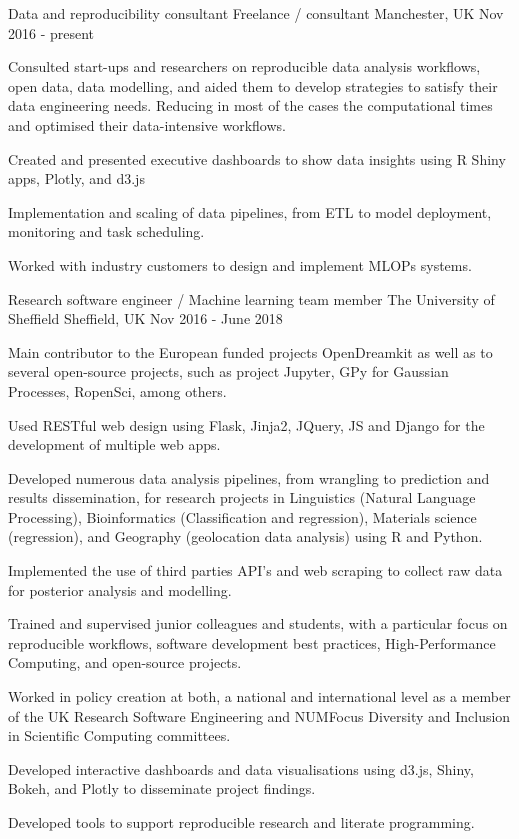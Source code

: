 \begin{cventries}
\cventry
{Data and reproducibility consultant } %
{Freelance / consultant } %
{Manchester,  UK} %
{Nov 2016 - present } %
{ %
\begin{cvitems}
\item {Consulted start-ups and researchers on reproducible data analysis workflows, open data, data modelling, and aided them to develop strategies to satisfy their data engineering needs. Reducing in most of the cases the computational times and optimised their data-intensive workflows.}
 \item {Created and presented executive dashboards to show data insights using R Shiny apps, Plotly, and d3.js}
 \item {Implementation and scaling of data pipelines, from ETL to model deployment, monitoring and task scheduling.}
 \item{Worked with industry customers to design and implement MLOPs systems.}
\end{cvitems}
}



\cventry
{Research software engineer  / Machine learning team member } %
{The University of Sheffield } %
{Sheffield, UK} %
{Nov 2016 - June 2018 } %
{ %
\begin{cvitems}
\item {Main contributor to  the European funded projects OpenDreamkit as well as to several open-source projects, such as project Jupyter, GPy for Gaussian Processes, RopenSci, among others.}
\item {Used RESTful web design using Flask, Jinja2, JQuery, JS and Django for the development of multiple web apps.}
\item {Developed numerous data analysis pipelines, from wrangling to prediction and results dissemination, for research projects in Linguistics (Natural Language Processing), Bioinformatics (Classification and regression), Materials science (regression), and Geography (geolocation data analysis) using R and Python.}
\item { Implemented the use of third parties API's and web scraping to collect raw data for posterior analysis and modelling.}
\item {Trained and supervised junior colleagues and students, with a particular focus on reproducible workflows, software development best practices, High-Performance Computing, and open-source projects.}
\item {Worked in policy creation at both, a national and international level as a member of the UK Research Software Engineering and NUMFocus Diversity and Inclusion in Scientific Computing committees.}
\item {Developed interactive dashboards and data visualisations using d3.js, Shiny, Bokeh, and Plotly to disseminate project findings.}
\item{Developed tools to support reproducible research and literate programming.}
\end{cvitems}
}



\end{cventries}

